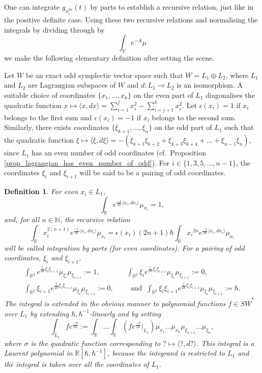 \documentclass[]{amsart}
\newtheorem{definition}[theorem]{Definition}
\theoremstyle{definition}
\begin{document}
One can integrate $g_{x_i^{2n}} (t)$ by parts to establish a recursive relation, just like in the positive definite case. Using these two recursive relations and normalising the integrals by dividing through by
\[
\int_V e^{-A} \mu
\]
we make the following elementary definition after setting the scene.

Let $W$ be an exact odd symplectic vector space such that $W=L_1\oplus L_2$, where $L_1$ and $L_2$ are Lagrangian subspaces of $W$ and $d\colon L_1\to L_2$ is an isomorphism. A suitable choice of coordinates $\lbrace x_1,\dots, x_k\rbrace$ on the even part of $L_1$ diagonalises the quadratic function $x\mapsto\langle x,dx \rangle=\sum_{i=1}^{j} x_i^2 - \sum_{i=j+1}^k x_i^2$. Let $\epsilon(x_i)=1$ if $x_i$ belongs to the first sum and $\epsilon(x_i)=-1$ if $x_i$ belongs to the second sum. Similarly, there exists coordinates $\lbrace \xi_{k+1},\dots, \xi_n \rbrace$ on the odd part of $L_1$ such that the quadratic function $\xi\mapsto \langle \xi ,d\xi \rangle= -(\xi_{k+1} \xi_{k+2} + \xi_{k+3} \xi_{k+4} + \dots + \xi_{n-1} \xi_n)$, since $L_1$ has an even number of odd coordinates (cf.\ Proposition \ref{prop_lagrangian_has_even_number_of_odd}). For $i\in\lbrace 1, 3, 5,\dots, n-1\rbrace$, the coordinates $\xi_i$ and $\xi_{i+1}$ will be said to be a pairing of odd coordinates.

\begin{definition}\label{def_integral}
For even $x_i\in L_1$,
\[
\int_\mathbb{R} e^{\frac{-1}{2\hbar}\langle x_i,dx_i \rangle} \mu_{x_i}=1,
\]
and, for all $n\in\mathbb{N}$, the recursive relation
\[
\int_{\mathbb{R}} x_i^{2(n+1)} e^{\frac{-1}{2\hbar}\langle x_i,dx_i \rangle} \mu_{x_i} = \epsilon (x_i) (2n+1)\hbar \int_{\mathbb{R}} {x_i}^{2n} e^{\frac{-1}{2\hbar}\langle x_i,dx_i \rangle} \mu_{x_i}
\]
will be called integration by parts (for even coordinates). For a pairing of odd coordinates, $\xi_i$ and $\xi_{i+1}$,
\begin{align*}
\int_{\mathbb{R}^2} e^{\frac{1}{2\hbar}\xi_i \xi_{i+1}} \mu_{\xi_i} \mu_{\xi_{i+1}}:=1,\quad& \int_{\mathbb{R}^2} \xi_i e^{\frac{1}{2\hbar}\xi_i \xi_{i+1} } \mu_{\xi_i} \mu_{\xi_{i+1}}:=0, \\
\int_{\mathbb{R}^2} \xi_{i+1} e^{\frac{1}{2\hbar}\xi_i \xi_{i+1} } \mu_{\xi_i} \mu_{\xi_{i+1}}:=0,\quad& \;\;\mathrm{and}\;\; \int_{\mathbb{R}^2} \xi_i \xi_{i+1} e^{\frac{1}{2\hbar}\xi_i \xi_{i+1} } \mu_{\xi_i} \mu_{\xi_{i+1}}:=\hbar.
\end{align*}
The integral is extended in the obvious manner to polynomial functions $f\in S \overline{W}^*$ over $L_1$ by extending $\hbar,\hbar^{-1}$-linearly and by setting
\[
\int_{L_1} f e^{\frac{-\sigma}{2\hbar}}  :=
\int_{\mathbb{R}}\dots\int_{\mathbb{R}} \left( f e^{\frac{-\sigma}{2\hbar}}\big|_{L_1}\right) \mu_{x_1}\dots\mu_{x_k}\mu_{\xi_{k+1}}\dots\mu_{\xi_n},
\]
where $\sigma$ is the quadratic function corresponding to $?\mapsto\langle ?,d? \rangle$. This integral is a Laurent polynomial in $\mathbb{R}[\hbar, \hbar^{-1}]$, because the integrand is restricted to $L_1$ and the integral is taken over all the coordinates of $L_1$.
\end{definition}
\end{document}
